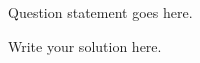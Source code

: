 \documentclass[12pt]{article}
\begin{document}

\begin{problem}{1} 
Question statement goes here.
\end{problem}
\begin{sol}
Write your solution here.
\end{sol}


\begin{comment}
\begin{problem}{1} 
Question statement goes here.
\end{problem}
\begin{sol}
Write your solution here.
\end{sol}
\end{comment}

\end{document}
